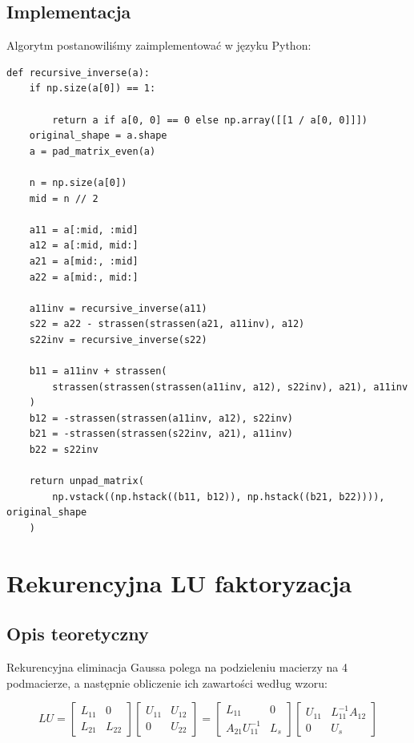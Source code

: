 \documentclass{article}
\begin{document}
\subsection{Implementacja}

Algorytm postanowiliśmy zaimplementować w języku Python:

\begin{verbatim}
def recursive_inverse(a):
    if np.size(a[0]) == 1:

        return a if a[0, 0] == 0 else np.array([[1 / a[0, 0]]])
    original_shape = a.shape
    a = pad_matrix_even(a)

    n = np.size(a[0])
    mid = n // 2

    a11 = a[:mid, :mid]
    a12 = a[:mid, mid:]
    a21 = a[mid:, :mid]
    a22 = a[mid:, mid:]

    a11inv = recursive_inverse(a11)
    s22 = a22 - strassen(strassen(a21, a11inv), a12)
    s22inv = recursive_inverse(s22)

    b11 = a11inv + strassen(
        strassen(strassen(strassen(a11inv, a12), s22inv), a21), a11inv
    )
    b12 = -strassen(strassen(a11inv, a12), s22inv)
    b21 = -strassen(strassen(s22inv, a21), a11inv)
    b22 = s22inv

    return unpad_matrix(
        np.vstack((np.hstack((b11, b12)), np.hstack((b21, b22)))), original_shape
    )
\end{verbatim}

\section{Rekurencyjna LU faktoryzacja}

\subsection{Opis teoretyczny}
Rekurencyjna eliminacja Gaussa polega na podzieleniu macierzy na 4 podmacierze, a następnie obliczenie ich zawartości według wzoru:

\begin{equation}
    LU = 
    \begin{bmatrix}
        L_{11} & 0 \\
        L_{21} & L_{22}
    \end{bmatrix}
    \begin{bmatrix}
        U_{11} & U_{12} \\
        0 & U_{22}
    \end{bmatrix}
    =
    \begin{bmatrix}
        L_{11} & 0 \\
        A_{21} U_{11}^{-1} & L_s
    \end{bmatrix}
    \begin{bmatrix}
        U_{11} & L_{11}^{-1} A_{12} \\
        0 & U_s
    \end{bmatrix}
\end{equation}
\end{document}
